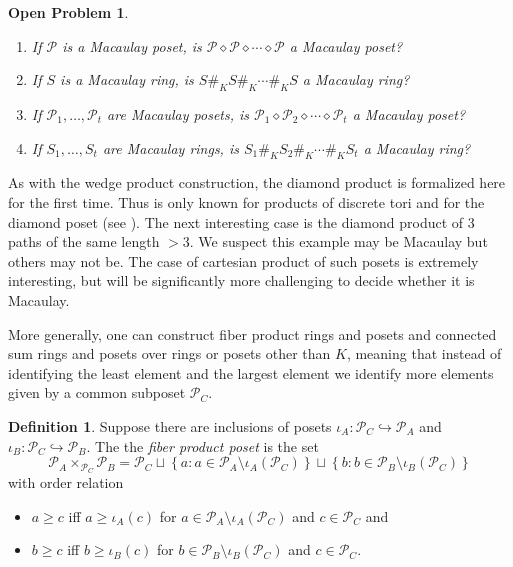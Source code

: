 \documentclass[11pt]{amsart}
\renewcommand{\P}{{\mathcal P}}
\newcommand{\di}{\diamond}
\theoremstyle{plain} %
\newtheorem{oprobl}{Open Problem}
\theoremstyle{definition}
\newtheorem{defn}[thm]{Definition}
\theoremstyle{remark}
\numberwithin{equation}{section}  %
\begin{document}
\begin{tcolorbox}[reset]
\begin{oprobl}\label{oprobl 3}
\begin{enumerate}
\item If $\P$ is a Macaulay poset,  is $\P\di \P\di \cdots \di \P$ a Macaulay poset?
\item If $S$ is a Macaulay ring, is  $S\#_K S\#_K \cdots \#_K S$  a Macaulay ring?
\item If $\P_1, \ldots, \P_t$ are Macaulay posets,  is $\P_1\di \P_2\di \cdots \di \P_t$ a Macaulay poset?
\item If $S_1, \ldots, S_t$ are Macaulay rings,  is $S_1\#_K S_2\#_K \cdots \#_K S_t$ a Macaulay ring?
\end{enumerate}
\end{oprobl}
\end{tcolorbox}

As with the wedge product construction, the diamond product is formalized here for the first time. Thus  is only known for products of discrete tori and for the diamond poset (see ). 
The next interesting case is the diamond product of 3 paths of the same length $>3$. We suspect this example may be Macaulay but others may not be. The case of cartesian product of such posets is extremely interesting, but will be significantly more challenging to decide whether it is Macaulay.

More generally, one can construct fiber product rings and posets and connected sum rings and posets over rings or posets other than $K$, meaning that instead of identifying the least element and the largest element we identify more elements  given by a common subposet $\P_C$. 

\begin{tcolorbox}
\begin{defn}\label{def: fiber prod poset}
Suppose there are inclusions of posets $\iota_A:\P_C\hookrightarrow \P_A$ and $\iota_B:\P_C\hookrightarrow\P_B$. The the {\em fiber product poset} is the set
\[
\P_A\times_{\P_C} \P_B = \P_C \sqcup \left \{ a : a\in \P_A\setminus \iota_A(\P_C)\right \} \sqcup \left \{ b : b \in \P_B\setminus \iota_B(\P_C)\right \}
\]
with order relation 
\begin{itemize}
\item $a\geq c$ iff $a\geq \iota_A(c)$ for $a\in \P_A\setminus \iota_A(\P_C)$ and $c\in \P_C$ and
\item $b\geq c$ iff $b\geq \iota_B(c)$ for $b\in \P_B\setminus \iota_B(\P_C)$ and $c\in \P_C$.
\end{itemize}
\end{defn}
\end{tcolorbox}
\end{document}
